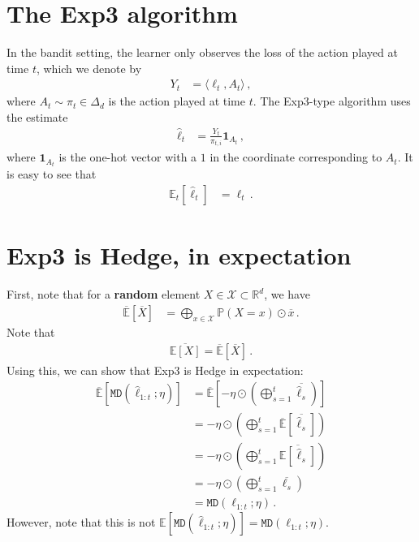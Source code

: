\documentclass{article}
\theoremstyle{plain}
\theoremstyle{definition}
\newcommand{\R}{\mathbb R}
\newcommand{\ip}[1]{\langle #1 \rangle}
\newcommand{\E}{\mathbb E}
\newcommand{\PP}{\mathbb P}
\newcommand{\fmd}{\texttt{MD}}
\newcommand{\hl}{\hat{\ell}\xspace}
\begin{document}
\section{The Exp3 algorithm}
In the bandit setting, the learner only observes the loss of the action played at time $t$, which we denote by
\begin{align*}
    Y_t & = \ip{\ell_t, A_t}\,,
\end{align*}
where $A_t \sim \pi_t \in \Delta_d$ is the action played at time $t$.
The Exp3-type algorithm uses the estimate
\begin{align*}
    \hl_{t} & = \frac{Y_t}{\pi_{t,i}} \mathbf{1}_{A_t}\,,
\end{align*}
where $\mathbf{1}_{A_t}$ is the one-hot vector with a $1$ in the coordinate corresponding to $A_t$.
It is easy to see that
\begin{align*}
    \E_t[\hl_t] & = \ell_t\,.
\end{align*}

\section{Exp3 is Hedge, in expectation}
First, note that for a \textbf{random} element $X \in \mathcal{X} \subset \R^d$, we have
\begin{align*}
    \overline{\E}[\overline{X}] & = \bigoplus_{x \in \mathcal{X}} \PP(X = x) \odot \overline{x}\,.
\end{align*}
Note that
\begin{align*}
    \overline{\E[X]} = \overline{\E}[\overline{X}]\,.
\end{align*}
Using this, we can show that Exp3 is Hedge in expectation:
\begin{align*}
    \overline{\E}[\fmd(\hl_{1:t}; \eta)] & =
    \overline{\E}\left[-\eta \odot \left( \bigoplus_{s=1}^t \overline{\hl_s} \right)\right]                               \\
                                         & = -\eta \odot \left( \bigoplus_{s=1}^t \overline{\E}[\overline{\hl_s}] \right) \\
                                         & = -\eta \odot \left( \bigoplus_{s=1}^t \overline{\E[\hl_s]} \right)            \\
                                         & = -\eta \odot \left( \bigoplus_{s=1}^t \overline{\ell_s} \right)               \\
                                         & = \fmd(\ell_{1:t}; \eta)\,.
\end{align*}
However, note that this is not $\E[\fmd(\hl_{1:t}; \eta)] = \fmd(\ell_{1:t}; \eta)$.
\end{document}
